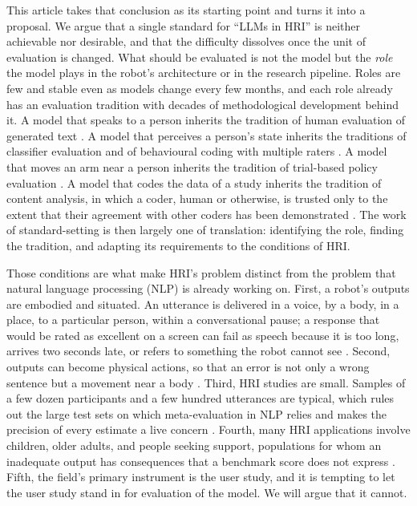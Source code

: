 This article takes that conclusion as its starting point and turns it into a
proposal. We argue that a single standard for ``LLMs in HRI'' is neither
achievable nor desirable, and that the difficulty dissolves once the unit of
evaluation is changed. What should be evaluated is not the model but the
\emph{role} the model plays in the robot's architecture or in the research
pipeline. Roles are few and stable even as models change every few months,
and each role already has an evaluation tradition with decades of
methodological development behind it. A model that speaks to a person
inherits the tradition of human evaluation of generated text
\cite{vanderlee2021human,howcroft2020twenty}. A model that perceives a
person's state inherits the traditions of classifier evaluation and of
behavioural coding with multiple raters \cite{hallgren2012computing}. A model
that moves an arm near a person inherits the tradition of trial-based policy
evaluation \cite{kressgazit2024robot}. A model that codes the data of a study
inherits the tradition of content analysis, in which a coder, human or
otherwise, is trusted only to the extent that their agreement with other
coders has been demonstrated \cite{krippendorff2019content}. The work of
standard-setting is then largely one of translation: identifying the role,
finding the tradition, and adapting its requirements to the conditions of HRI.

Those conditions are what make HRI's problem distinct from the problem that
natural language processing (NLP) is already working on. First, a robot's
outputs are embodied and situated. An utterance is delivered in a voice, by a
body, in a place, to a particular person, within a conversational pause; a
response that would be rated as excellent on a screen can fail as speech
because it is too long, arrives two seconds late, or refers to something the
robot cannot see \cite{skantze2021turn,irfan2025between}. Second, outputs can
become physical actions, so that an error is not only a wrong sentence but a
movement near a body \cite{robey2025jailbreaking,hundt2025llm}. Third, HRI
studies are small. Samples of a few dozen participants and a few hundred
utterances are typical, which rules out the large test sets on which
meta-evaluation in NLP relies and makes the precision of every estimate a
live concern \cite{leichtmann2022crisis}. Fourth, many HRI applications
involve children, older adults, and people seeking support, populations for
whom an inadequate output has consequences that a benchmark score does not
express \cite{abbasi2025robotled,irfan2024recommendations}. Fifth, the field's
primary instrument is the user study, and it is tempting to let the user
study stand in for evaluation of the model. We will argue that it cannot.

